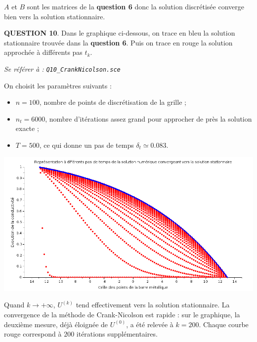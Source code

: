 \documentclass[a4paper,11pt]{article}
\newcommand{\quest}[1]{\small\textbf{#1}\normalsize}
\theoremstyle{nonumberplain}
\theoremstyle{nonumberplain}
\theoremstyle{nonumberplain}
\begin{document}
    $A$ et $B$ sont les matrices de la \textbf{question 6} donc la solution
    discrétisée converge bien vers la solution stationnaire.

    \newpage\quest{QUESTION 10}. Dans le graphique ci-dessous, on trace en bleu la solution
    stationnaire trouvée dans la \textbf{question 6}. Puis on trace en
    rouge la solution approchée à différents pas $t_k$.

    \begin{ref_scilab}
        \emph{Se référer à :} \texttt{\emph{Q10\_CrankNicolson.sce}}
    \end{ref_scilab}

    \smallskip
    On choisit les paramètres suivants :
    \begin{itemize}
        \item $n = 100$, nombre de points de discrétisation de la grille ;
        \item $n_t = 6000$, nombre d'itérations assez grand pour approcher de près la solution exacte ;
        \item $T = 500$, ce qui donne un pas de temps $\delta_t \simeq 0.083$.
    \end{itemize}

    \begin{center}
        \includegraphics[scale=0.5]{images/q10_approche2.png}
    \end{center}

    Quand $k \rightarrow +\infty$, $U^{(k)}$ tend effectivement vers la solution stationnaire.
    La convergence de la méthode de Crank-Nicolson est rapide : sur le
    graphique, la deuxième mesure, déjà éloignée de $U^{(0)}$, a été relevée à $k = 200$. Chaque courbe rouge
    correspond à $200$ itérations supplémentaires.
\end{document}
